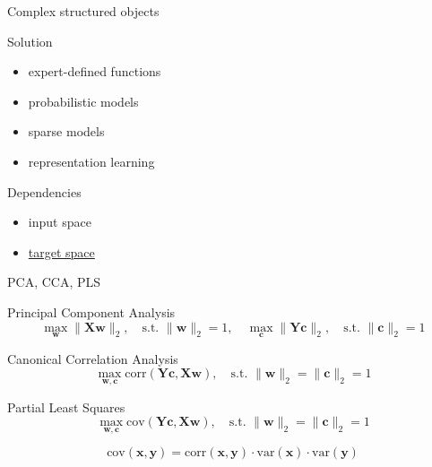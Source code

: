 \documentclass[9pt]{beamer}
\newcommand{\bx}{\mathbf{x}}
\newcommand{\by}{\mathbf{y}}
\newcommand{\bw}{\mathbf{w}}
\newcommand{\bY}{\mathbf{Y}}
\newcommand{\bX}{\mathbf{X}}
\newcommand{\bc}{\mathbf{c}}
\begin{document}
\begin{frame}{Complex structured objects}
\begin{minipage}{0.5\textwidth}
\begin{block}{Solution}
\begin{itemize}
	\item expert-defined functions
	\item probabilistic models
	\item sparse models
	\item representation learning
\end{itemize}
\end{block}
\end{minipage}%
\begin{minipage}{0.5\textwidth}
\begin{block}{Dependencies}
	\begin{itemize}
		\item input space
		\item \underline{target space}
	\end{itemize}
\end{block}
\end{minipage}
\end{frame}
\begin{frame}{PCA, CCA, PLS}

\begin{block}{Principal Component Analysis}
	\[
		\max_{\bw} \| \bX \bw \|_2, \quad \text{s.t. } \| \bw \|_2 = 1, \quad \max_{\bc} \| \bY \bc \|_2, \quad \text{s.t. }  \| \bc \|_2 = 1
	\]
\end{block}

\begin{block}{Canonical Correlation Analysis}
	\[
	\max_{\bw, \bc} \text{corr}(\bY \bc,  \bX \bw ), \quad \text{s.t. }  \| \bw \|_2 = \| \bc \|_2 = 1
	\]
\end{block}

\begin{block}{Partial Least Squares}
	\[
	\max_{\bw, \bc} \text{cov}(\bY \bc,  \bX \bw ), \quad \text{s.t. }  \| \bw \|_2 = \| \bc \|_2 = 1
	\]
\end{block}

\[
	\text{cov}(\bx, \by) = \text{corr}(\bx, \by) \cdot \text{var}(\bx) \cdot \text{var}(\by) 
\]
\end{frame}
\end{document}
